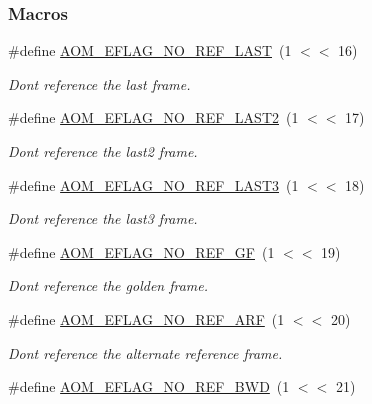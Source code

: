 \subsubsection*{Macros}
\begin{DoxyCompactItemize}
\item 
\#define \hyperlink{group__aom__encoder_gae272ed6e69ae2a12993565e8176d004b}{A\+O\+M\+\_\+\+E\+F\+L\+A\+G\+\_\+\+N\+O\+\_\+\+R\+E\+F\+\_\+\+L\+A\+ST}~(1 $<$$<$ 16)
\begin{DoxyCompactList}\small\item\em Don\textquotesingle{}t reference the last frame. \end{DoxyCompactList}\item 
\#define \hyperlink{group__aom__encoder_ga50c2560ca6670298cfc614ecae96a391}{A\+O\+M\+\_\+\+E\+F\+L\+A\+G\+\_\+\+N\+O\+\_\+\+R\+E\+F\+\_\+\+L\+A\+S\+T2}~(1 $<$$<$ 17)
\begin{DoxyCompactList}\small\item\em Don\textquotesingle{}t reference the last2 frame. \end{DoxyCompactList}\item 
\#define \hyperlink{group__aom__encoder_gaa4bc8ae2b977b73f0ef57ba428ca1d2c}{A\+O\+M\+\_\+\+E\+F\+L\+A\+G\+\_\+\+N\+O\+\_\+\+R\+E\+F\+\_\+\+L\+A\+S\+T3}~(1 $<$$<$ 18)
\begin{DoxyCompactList}\small\item\em Don\textquotesingle{}t reference the last3 frame. \end{DoxyCompactList}\item 
\#define \hyperlink{group__aom__encoder_gaaef6fe76991abf87edd2f296eee999f8}{A\+O\+M\+\_\+\+E\+F\+L\+A\+G\+\_\+\+N\+O\+\_\+\+R\+E\+F\+\_\+\+GF}~(1 $<$$<$ 19)
\begin{DoxyCompactList}\small\item\em Don\textquotesingle{}t reference the golden frame. \end{DoxyCompactList}\item 
\#define \hyperlink{group__aom__encoder_ga9e2f989737d63ddf4e987a525d186a46}{A\+O\+M\+\_\+\+E\+F\+L\+A\+G\+\_\+\+N\+O\+\_\+\+R\+E\+F\+\_\+\+A\+RF}~(1 $<$$<$ 20)
\begin{DoxyCompactList}\small\item\em Don\textquotesingle{}t reference the alternate reference frame. \end{DoxyCompactList}\item 
\#define \hyperlink{group__aom__encoder_ga758649aa6cd9fefb15ad888489884a38}{A\+O\+M\+\_\+\+E\+F\+L\+A\+G\+\_\+\+N\+O\+\_\+\+R\+E\+F\+\_\+\+B\+WD}~(1 $<$$<$ 21)

\end{DoxyCompactItemize}
